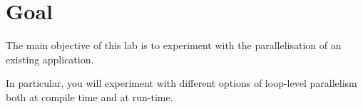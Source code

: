 \section{Goal}

The main objective of this lab is to experiment with the parallelisation of an
existing application.

In particular, you will experiment with different options of loop-level
parallelism both at compile time and at run-time.
